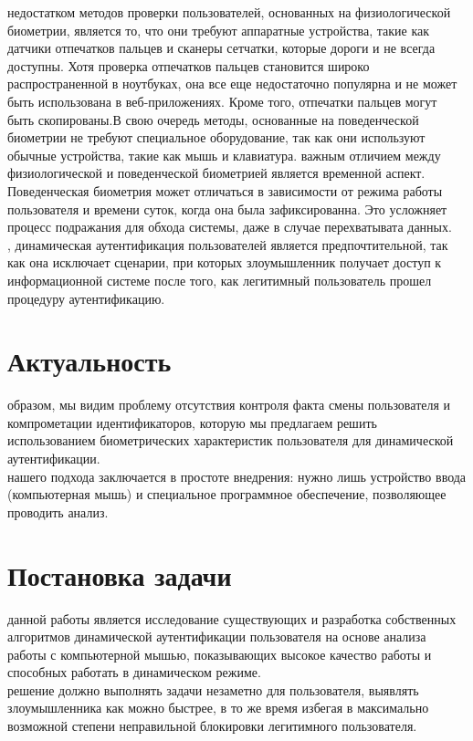 \documentclass[12pt]{article}
\begin{document}
     недостатком методов проверки пользователей, основанных на физиологической биометрии, является то, что они требуют аппаратные устройства, такие как датчики отпечатков пальцев и сканеры сетчатки, которые дороги и не всегда доступны. Хотя проверка отпечатков пальцев становится широко распространенной в ноутбуках, она все еще недостаточно популярна и не может быть использована в веб-приложениях. Кроме того, отпечатки пальцев могут быть скопированы.В свою очередь методы, основанные на поведенческой биометрии не требуют специальное оборудование, так как они используют обычные устройства, такие как мышь и клавиатура.
     важным отличием между физиологической и поведенческой биометрией является временной аспект. Поведенческая биометрия может отличаться в зависимости от режима работы пользователя и времени суток, когда она была зафиксированна. Это усложняет процесс подражания для обхода системы, даже в случае перехватывата данных.\\

    , динамическая аутентификация пользователей является предпочтительной, так как она исключает сценарии, при которых злоумышленник получает доступ к информационной системе после того, как легитимный пользователь прошел процедуру аутентификацию.

    \newpage



    \section{Актуальность}
    \label{sec:Relevance}

     образом, мы видим проблему отсутствия контроля факта смены пользователя и компрометации идентификаторов, которую мы предлагаем решить использованием биометрических характеристик пользователя для динамической аутентификации. \\
     нашего подхода заключается в простоте внедрения: нужно лишь устройство ввода (компьютерная мышь) и специальное программное обеспечение, позволяющее проводить анализ.

    \newpage



    \section{Постановка задачи}
    \label{sec:FormulationOfProblem}
    
     данной работы является исследование существующих и разработка собственных алгоритмов динамической аутентификации пользователя на основе анализа работы с компьютерной мышью, показывающих высокое качество работы и способных работать в динамическом режиме. \\
     решение должно выполнять задачи незаметно для пользователя, выявлять злоумышленника как можно быстрее, в то же время избегая в максимально возможной степени неправильной блокировки легитимного пользователя.
\end{document}
